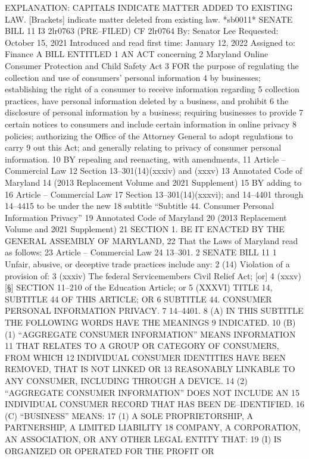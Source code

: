 EXPLANATION: CAPITALS INDICATE MATTER ADDED TO EXISTING LAW.
 [Brackets] indicate matter deleted from existing law.
 *sb0011*
SENATE BILL 11
I3 2lr0763
(PRE–FILED) CF 2lr0764
By: Senator Lee
Requested: October 15, 2021
Introduced and read first time: January 12, 2022
Assigned to: Finance
A BILL ENTITLED
1 AN ACT concerning
2 Maryland Online Consumer Protection and Child Safety Act
3 FOR the purpose of regulating the collection and use of consumers’ personal information
4 by businesses; establishing the right of a consumer to receive information regarding
5 collection practices, have personal information deleted by a business, and prohibit
6 the disclosure of personal information by a business; requiring businesses to provide
7 certain notices to consumers and include certain information in online privacy
8 policies; authorizing the Office of the Attorney General to adopt regulations to carry
9 out this Act; and generally relating to privacy of consumer personal information.
10 BY repealing and reenacting, with amendments,
11 Article – Commercial Law
12 Section 13–301(14)(xxxiv) and (xxxv)
13 Annotated Code of Maryland
14 (2013 Replacement Volume and 2021 Supplement)
15 BY adding to
16 Article – Commercial Law
17 Section 13–301(14)(xxxvi); and 14–4401 through 14–4415 to be under the new
18 subtitle “Subtitle 44. Consumer Personal Information Privacy”
19 Annotated Code of Maryland
20 (2013 Replacement Volume and 2021 Supplement)
21 SECTION 1. BE IT ENACTED BY THE GENERAL ASSEMBLY OF MARYLAND,
22 That the Laws of Maryland read as follows:
23 Article – Commercial Law
24 13–301.
2 SENATE BILL 11
1 Unfair, abusive, or deceptive trade practices include any:
2 (14) Violation of a provision of:
3 (xxxiv) The federal Servicemembers Civil Relief Act; [or]
4 (xxxv) [§] SECTION 11–210 of the Education Article; or
5 (XXXVI) TITLE 14, SUBTITLE 44 OF THIS ARTICLE; OR
6 SUBTITLE 44. CONSUMER PERSONAL INFORMATION PRIVACY.
7 14–4401.
8 (A) IN THIS SUBTITLE THE FOLLOWING WORDS HAVE THE MEANINGS
9 INDICATED.
10 (B) (1) “AGGREGATE CONSUMER INFORMATION” MEANS INFORMATION
11 THAT RELATES TO A GROUP OR CATEGORY OF CONSUMERS, FROM WHICH
12 INDIVIDUAL CONSUMER IDENTITIES HAVE BEEN REMOVED, THAT IS NOT LINKED OR
13 REASONABLY LINKABLE TO ANY CONSUMER, INCLUDING THROUGH A DEVICE.
14 (2) “AGGREGATE CONSUMER INFORMATION” DOES NOT INCLUDE AN
15 INDIVIDUAL CONSUMER RECORD THAT HAS BEEN DE–IDENTIFIED.
16 (C) “BUSINESS” MEANS:
17 (1) A SOLE PROPRIETORSHIP, A PARTNERSHIP, A LIMITED LIABILITY
18 COMPANY, A CORPORATION, AN ASSOCIATION, OR ANY OTHER LEGAL ENTITY THAT:
19 (I) IS ORGANIZED OR OPERATED FOR THE PROFIT OR
